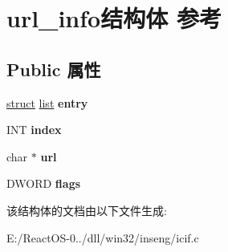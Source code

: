 \hypertarget{structurl__info}{}\section{url\+\_\+info结构体 参考}
\label{structurl__info}
\subsection*{Public 属性}
\begin{DoxyCompactItemize}
\item 
\mbox{\label{structurl__info_a263f8f80466632d92919a91586910020}} 
\hyperlink{interfacestruct}{struct} \hyperlink{classlist}{list} {\bfseries entry}
\item 
\mbox{\label{structurl__info_ac41a3fb3f0f1d615193b12ce5f66fb39}} 
I\+NT {\bfseries index}
\item 
\mbox{\label{structurl__info_ace29641ed094a9ab0a0fff4eca50fd30}} 
char $\ast$ {\bfseries url}
\item 
\mbox{\label{structurl__info_a3995ccb806ee66233e49bdc5d6ba8ce0}} 
D\+W\+O\+RD {\bfseries flags}
\end{DoxyCompactItemize}


该结构体的文档由以下文件生成\+:\begin{DoxyCompactItemize}
\item 
E\+:/\+React\+O\+S-\/0../dll/win32/inseng/icif.\+c\end{DoxyCompactItemize}
